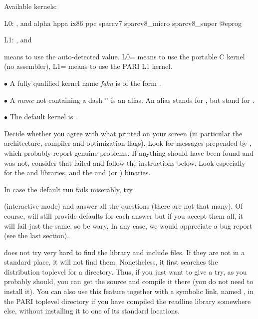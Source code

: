 \noindent Available kernels:

L0: ,  and
\bprog
alpha  hppa  ix86  ppc  sparcv7  sparcv8_micro  sparcv8_super
@eprog

L1: ,  and 

\noindent {} means to use the auto-detected value. L0= means
to use the portable C kernel (no assembler), L1= means to use the
PARI L1 kernel. 

\noindent$\bullet$ A fully qualified kernel name \emph{fqkn} is of the form
.

\noindent$\bullet$ A \emph{name} not containing a dash '\kbd{-}' is an alias.
An alias stands for , but  stand for
.

\noindent$\bullet$ The default kernel is .


 Decide whether you agree with what
 printed on your screen (in particular the architecture,
compiler and optimization flags). Look for messages prepended by
\kbd{\#\#\#}, which probably report genuine problems. If anything should have
been found and was not, consider that  failed and follow the
instructions below. Look especially for the  and 
libraries, and the  and  (or ) binaries.

In case the default  run fails miserably, try


\noindent (interactive mode) and answer all the questions (there are not that
many). Of course,  will still provide defaults for each answer
but if you accept them all, it will fail just the same, so be wary. In any
case, we would appreciate a bug report (see the last section).

 does not try very hard to find the  library and
include files. If they are not in a standard place, it will not find them.
Nonetheless, it first searches the distribution toplevel for a 
directory. Thus, if you just want to give  a try, as you
probably should, you can get the source and compile it there (you do not need
to install it). You can also use this feature together with a symbolic link,
named , in the PARI toplevel directory if you have compiled the
readline library somewhere else, without installing it to one of its standard
locations. 

